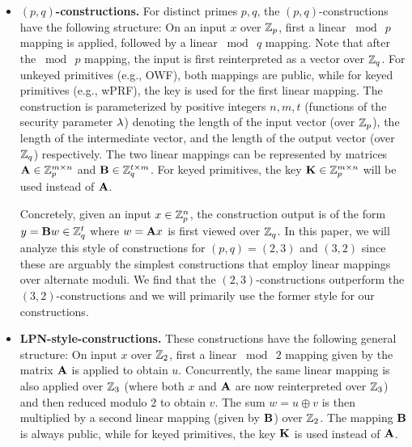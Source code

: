 \begin{itemize}
    \item \textbf{$(p,q)$-constructions.}
    For distinct primes $p, q$, the $(p,q)$-constructions have the following structure: On an input $x$ over $\mathbb{Z}_p$, first a linear $\bmod~p$ mapping is applied, followed by a linear $\bmod~q$ mapping. Note that after the $\bmod~p$ mapping, the input is first reinterpreted as a vector over $\mathbb{Z}_q$. For unkeyed primitives (e.g., OWF), both mappings are public, while for keyed primitives (e.g., wPRF), the key is used for the first linear mapping. The construction is parameterized by positive integers $n, m, t$ (functions of the security parameter $\lambda$) denoting the length of the input vector (over $\mathbb{Z}_p$), the length of the intermediate vector, and the length of the output vector (over $\mathbb{Z}_q$) respectively. The two linear mappings can be represented by matrices $\mat{A} \in \Z_p^{m \times n}$ and $\mat{B} \in \Z_q^{t \times m}$. For keyed primitives, the key $\mat{K} \in \Z_p^{m \times n}$ will be used instead of $\mat{A}$.

    \hspace*{1em} Concretely, given an input $x \in \mathbb{Z}_p^n$, the construction output is of the form $y = \mat{B}w \in \Z_q^t$ where $w = \mat{A}{x}$ is first viewed over $\mathbb{Z}_q$. In this paper, we will analyze this style of constructions for $(p,q) = (2,3)$ and $(3,2)$ since these are arguably the simplest constructions that employ linear mappings over alternate moduli. We find that the $(2,3)$-constructions outperform the $(3,2)$-constructions and we will primarily use the former style for our constructions.

    
    \item \textbf{LPN-style-constructions.}
    These constructions have the following general structure: On input $x$ over $\mathbb{Z}_2$, first a linear $\bmod~2$ mapping given by the matrix $\mat{A}$ is applied to obtain $u$. Concurrently, the same linear mapping is also applied over $\mathbb{Z}_3$ (where both $x$ and $\mat{A}$ are now reinterpreted over $\mathbb{Z}_3$) and then reduced modulo $2$ to obtain $v$. The sum $w = u \oplus v$ is then multiplied by a second linear mapping (given by $\mat{B}$) over $\mathbb{Z}_2$. The mapping $\mat{B}$ is always public, while for keyed primitives, the key $\mat{K}$ is used instead of $\mat{A}$.


\end{itemize}
